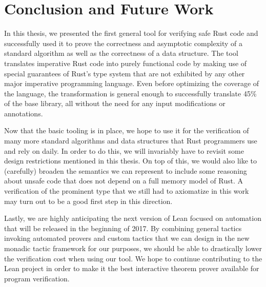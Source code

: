 \section{Conclusion and Future Work}

In this thesis, we presented the first general tool for verifying safe Rust code
and successfully used it to prove the correctness and asymptotic complexity of
a standard algorithm as well as the correctness of a data structure. The tool translates
imperative Rust code into purely functional code by making use of special
guarantees of Rust's type system that are not exhibited by any other major
imperative programming language. Even before optimizing the coverage of the
language, the transformation is general enough to successfully translate 45\% of
the base  library, all without the need for any input modifications or annotations.

Now that the basic tooling is in place, we hope to use it for the verification
of many more standard algorithms and data structures that Rust programmers
use and rely on daily. In order to do this, we will invariably have to revisit some
design restrictions mentioned in this thesis. On top of this, we would also
like to (carefully) broaden the semantics we can represent to include some
reasoning about unsafe code that does not depend on a full memory model of Rust.
A verification of the prominent  type that we still had to axiomatize in
this work may turn out to be a good first step in this direction.

Lastly, we are highly anticipating the next version of Lean focused on
automation that will be released in the beginning of 2017. By combining general
tactics invoking automated provers and custom tactics that we can design in the
new monadic tactic framework for our purposes, we should be able to drastically
lower the verification cost when using our tool. We hope to continue
contributing to the Lean project in order to make it the best interactive
theorem prover available for program verification.